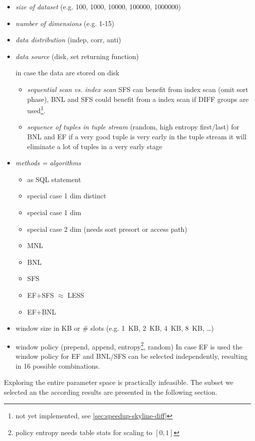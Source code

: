\begin{itemize}
\item \emph{size of dataset} (e.g. 100, 1000, 10000, 100000, 1000000)
\item \emph{number of dimensions} (e.g. 1-15)
\item \emph{data distribution} (indep, corr, anti)
\item \emph{data source} (disk, set returning function)

in case the data are stored on disk
\begin{itemize}
\item 
\emph{sequential scan vs. index scan} SFS can benefit from index scan
(omit sort phase), BNL and SFS could benefit from a index scan if
DIFF groups are used\footnote{not yet implemented, see \autoref{sec:speedup-skyline-diff}}.

\item \emph{sequence of tuples in tuple stream} (random, high entropy first/last) for BNL and EF if a very good tuple is very early in the tuple stream it will eliminate a lot of tuples in a very early stage
\end{itemize}
\item \emph{methods = algorithms}

\begin{itemize}
\item as SQL statement
\item special case 1 dim distinct
\item special case 1 dim 
\item special case 2 dim (needs sort presort or access path)
\item MNL
\item BNL
\item SFS
\item EF+SFS $\approx$ LESS
\item EF+BNL
\end{itemize}

\item window size in KB or \# slots (e.g. 1~KB, 2~KB, 4~KB, 8~KB, \ldots)
\item window policy (prepend, append, entropy\footnote{policy entropy needs table stats for scaling to $[0,1]$}, random) In case EF is used the window policy for EF and BNL/SFS can be selected independently, resulting in 16 possible combinations.
\end{itemize}

Exploring the entire parameter space is practically infeasible.
The subset we selected an the according results are presented in the following section.

